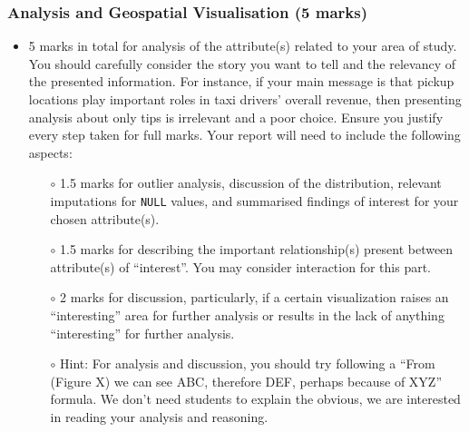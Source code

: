 \documentclass[12pt]{article}
\begin{document}
\subsubsection*{Analysis and Geospatial Visualisation (5 marks)}
\begin{itemize} 
    \item 5 marks in total for analysis of the attribute(s) related to your area of study. You should carefully consider the story you want to tell and the relevancy of the presented information. For instance, if your main message is that pickup locations play important roles in taxi drivers' overall revenue, then presenting analysis about only tips is irrelevant and a poor choice.
    Ensure you justify every step taken for full marks. Your report will need to include the following aspects:
    \begin{itemize}
        \item[$\circ$] 1.5 marks for outlier analysis, discussion of the distribution, relevant imputations for \texttt{NULL} values, and summarised findings of interest for your chosen attribute(s).
        \item[$\circ$] 1.5 marks for describing the important relationship(s) present between attribute(s) of ``interest''. You may consider interaction for this part.
        \item[$\circ$] 2 marks for discussion, particularly, if a certain visualization raises an ``interesting'' area for further analysis or results in the lack of anything ``interesting'' for further analysis.
        \item[$\circ$] Hint: For analysis and discussion, you should try following a ``From (Figure X) we can see ABC, therefore DEF, perhaps because of XYZ'' formula. We don't need students to explain the obvious, we are interested in reading your analysis and reasoning.
    \end{itemize}
\end{itemize}
\end{document}
